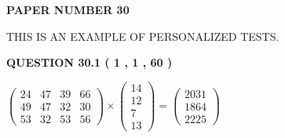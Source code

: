 \documentclass[12pt]{article}
\begin{document}
   
   
   
\newpage 
\setcounter{page}{ 
    30001 } 
   
   
   
   
 {\textbf{ \Large{ PAPER NUMBER           30  }}}
   
   
\vspace{0.2in}
   
   
   
   
   
   
 \vspace{0.2in}
{\Huge  THIS IS AN EXAMPLE OF}
{\Huge  PERSONALIZED TESTS. }
   
   
  
\vspace{0.2in}
  
{\textbf{\Large{QUESTION
30.1 
 (           1 ,           1 ,          60 )
}}}
  
  
 
 
\noindent{}

 
$\left( \begin{array}{ccccccccccccccc}
          24  & 
          47  & 
          39  & 
          66  \\ 
          49  & 
          47  & 
          32  & 
          30  \\ 
          53  & 
          32  & 
          53  & 
          56
\end{array}\right) \times
\left( \begin{array}{c}
          14  \\ 
          12  \\ 
           7  \\ 
          13
\end{array}\right)  =
\left( \begin{array}{c}
        2031  \\ 
        1864  \\ 
        2225
\end{array}\right)  $
 
\end{document}
